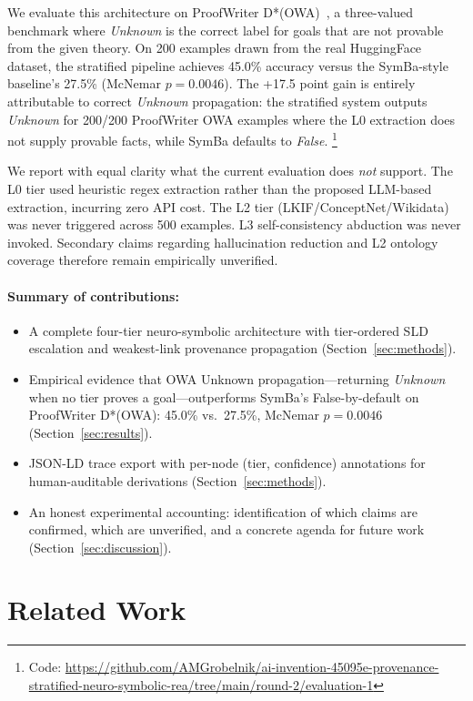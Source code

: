 \documentclass[11pt,letterpaper]{article}
\begin{document}
We evaluate this architecture on ProofWriter D*(OWA)~\citep{Tafjord2021}, a three-valued benchmark where \emph{Unknown} is the correct label for goals that are not provable from the given theory.
On 200 examples drawn from the real HuggingFace dataset, the stratified pipeline achieves 45.0\% accuracy versus the SymBa-style
baseline's 27.5\% (McNemar $p = 0.0046$). The +17.5 point gain is entirely attributable to correct \emph{Unknown} propagation:
the stratified system outputs \emph{Unknown} for 200/200 ProofWriter OWA examples where the L0 extraction does not supply provable
facts, while SymBa defaults to \emph{False}.
\footnote{Code: \url{https://github.com/AMGrobelnik/ai-invention-45095e-provenance-stratified-neuro-symbolic-rea/tree/main/round-2/evaluation-1}}

We report with equal clarity what the current evaluation does \emph{not} support. The L0 tier used heuristic regex extraction
rather than the proposed LLM-based extraction, incurring zero API cost. The L2 tier (LKIF/ConceptNet/Wikidata) was never
triggered across 500 examples. L3 self-consistency abduction was never invoked. Secondary claims regarding hallucination
reduction and L2 ontology coverage therefore remain empirically unverified.

\paragraph{Summary of contributions:}
\begin{itemize}
\item A complete four-tier neuro-symbolic architecture with tier-ordered SLD escalation and weakest-link provenance propagation (Section~\ref{sec:methods}).
\item Empirical evidence that OWA Unknown propagation---returning \emph{Unknown} when no tier proves a goal---outperforms SymBa's
False-by-default on ProofWriter D*(OWA): 45.0\% vs.\ 27.5\%, McNemar $p = 0.0046$ (Section~\ref{sec:results}).
\item JSON-LD trace export with per-node (tier, confidence) annotations for human-auditable derivations (Section~\ref{sec:methods}).
\item An honest experimental accounting: identification of which claims are confirmed, which are unverified, and a concrete agenda for future work (Section~\ref{sec:discussion}).
\end{itemize}

\section{Related Work}
\end{document}
